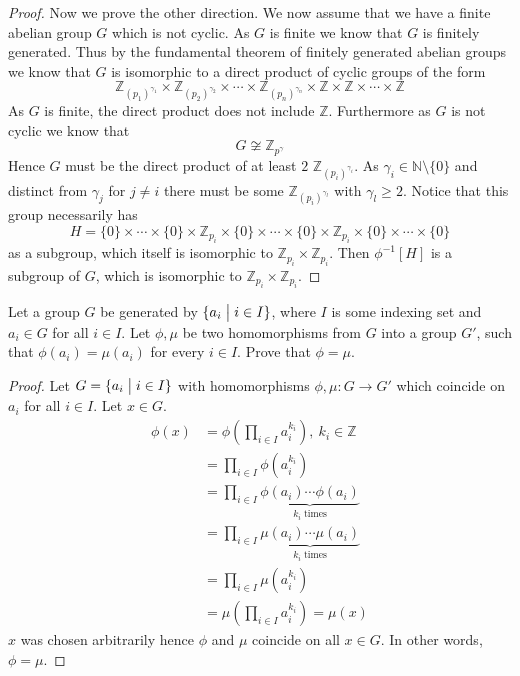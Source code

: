 \begin{proof}
    Now we prove the other direction. 
    We now assume that we have a finite abelian group $G$ which 
    is not cyclic. As $G$ is finite we know that $G$ is finitely 
    generated. Thus by the fundamental theorem of finitely generated
    abelian groups we know that $G$ is isomorphic to a direct product 
    of cyclic groups of the form 
    \[
        \mathbb Z_{(p_1)^{\gamma_1}}
        \times 
        \mathbb Z_{(p_2)^{\gamma_2}}
        \times \cdots \times 
        \mathbb Z_{(p_n)^{\gamma_n}} 
        \times 
        \mathbb Z 
        \times \mathbb Z
        \times \cdots \times 
        \mathbb Z
    \]
    As $G$ is finite, the direct product does not include 
    $\mathbb Z$. Furthermore as $G$ is not cyclic we know that 
    \[
        G \not\cong \mathbb Z_{p^\gamma}
    \]
    Hence $G$ must be the direct product of at least $2$ 
    $\mathbb Z_{(p_i)^{\gamma_i}}$. As $\gamma_i \in \mathbb N 
    \setminus \{0\}$ and distinct from $\gamma_j$ for $j \neq i$ 
    there must be some $\mathbb Z_{(p_i)^{\gamma_l}}$ with 
    $\gamma_l \geq 2$. Notice that this group necessarily 
    has 
    \[
        H = \{0\} \times \cdots \times \{0\} \times 
        \mathbb Z_{p_i} \times \{0\} \times \cdots 
        \times \{0\} \times \mathbb Z_{p_i} \times \{0\} \times 
        \cdots \times \{0\}
    \]
    as a subgroup, which itself is isomorphic to 
    $\mathbb Z_{p_i} \times \mathbb Z_{p_i}$. 
    Then $\phi^{-1}[H]$ is a subgroup of $G$, which is 
    isomorphic to $\mathbb Z_{p_i} \times \mathbb Z_{p_i}$.
\end{proof}

\begin{prob}
    Let a group $G$ be generated by $\{a_i \bigm| i \in I\}$, 
    where $I$ is some indexing set and $a_i \in G$ for all $i \in I$.
    Let $\phi,\mu$ be two homomorphisms from $G$ into a group $G'$, 
    such that $\phi(a_i) = \mu(a_i)$ for every $i \in I$. 
    Prove that $\phi = \mu$.
\end{prob}
\begin{proof}
    Let $G = \{a_i \bigm| i\in I\}$ with homomorphisms 
    $\phi, \mu : G \to G'$ which coincide on $a_i$ for all $i \in I$.
    Let $x \in G$. 
    \begin{align*}
        \phi(x) &= \phi\left(\prod_{i \in I} a_i^{k_i}\right), \: 
        k_i \in \mathbb Z \\ 
                &= \prod_{i\in I} \phi(a_i^{k_i}) \\ 
                &= \prod_{i\in I} 
                \underbrace{\phi(a_i)\cdots 
                \phi(a_i)}_{k_i \; \text{times}} \\ 
                &= \prod_{i\in I} \underbrace{\mu(a_i)\cdots 
                \mu(a_i)}_{k_i \; \text{times}} \\ 
                &= \prod_{i\in I} \mu(a_i^{k_i}) \\ 
                &= \mu\left(\prod_{i \in I}a_i^{k_i}\right) 
                = \mu(x)
    \end{align*}
    $x$ was chosen arbitrarily hence $\phi$ and $\mu$ coincide 
    on all $x \in G$. In other words, $\phi = \mu$.
\end{proof}

